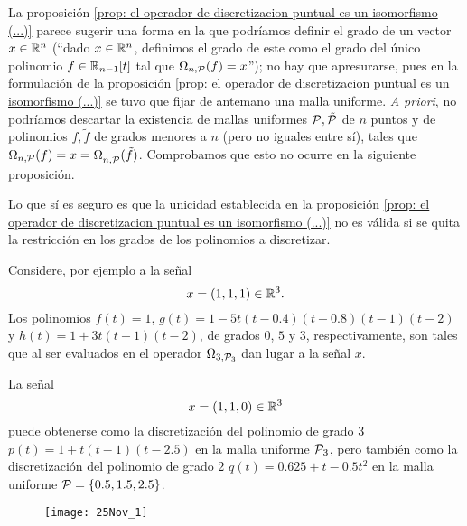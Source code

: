 La proposición
\ref{prop: el operador de discretizacion puntual es un isomorfismo (...)}
parece sugerir 
una forma en la que podríamos 
definir el grado de 
un vector $x \in \mathbb{R}^{n}$ (``dado $x \in \mathbb{R}^{n}$, definimos
el grado de este como el grado del único polinomio $f \in \mathbb{R}_{n-1}[t]$
tal que $\Omega_{n, \mathcal{P}}(f)=x$''); no hay
que apresurarse, pues en la formulación de
la proposición
\ref{prop: el operador de discretizacion puntual es un isomorfismo (...)}
se tuvo que fijar de antemano una malla uniforme.
\textit{A priori}, no podríamos descartar 
la existencia de mallas uniformes
$\mathcal{P}, \tilde{\mathcal{P}}$ 
de $n$ puntos
y de polinomios
$f, \tilde{f}$ de grados menores a $n$ (pero no 
iguales entre sí), tales que
$\Omega_{n, \mathcal{P}}(f) = x = \Omega_{n, \tilde{\mathcal{P}}}(\tilde{f})$.
Comprobamos que esto no ocurre
en la siguiente proposición.



\begin{ejemplo}
Lo que sí es seguro es que la unicidad establecida en la proposición \ref{prop: el operador de discretizacion puntual es un isomorfismo (...)} no es válida si se quita la restricción en los grados de los polinomios a discretizar.

Considere, por ejemplo a la señal
\[
x = (1,1,1) \in \mathbb{R}^{3}.
\]
Los polinomios 
$f(t)=1$, $g(t)= 1-5t(t-0.4)(t-0.8)(t-1)(t-2)$
y $h(t) = 1+3t(t-1)(t-2)$,
de grados $0$, $5$ y $3$, respectivamente, son tales
que al ser evaluados en el operador
$\Omega_{3, \mathcal{P}_{3}}$ dan lugar a la señal $x$.

La señal 
\[
x = (1,1,0) \in \mathbb{R}^{3}
\]
puede obtenerse como la discretización
del polinomio de grado $3$
$p(t) = 1+t(t-1)(t-2.5)$ en la  
malla uniforme $\mathcal{P}_{3}$, pero también como
la discretización del polinomio de grado $2$
$q(t)= 0.625 + t - 0.5t^{2}$
en la malla uniforme $\mathcal{P} = \{
0.5, 1.5, 2.5 \}$.

\begin{figure}[H]
	\centering
	\texttt{[image: 25Nov\_1]} 
\end{figure}	
\final 
\end{ejemplo}


